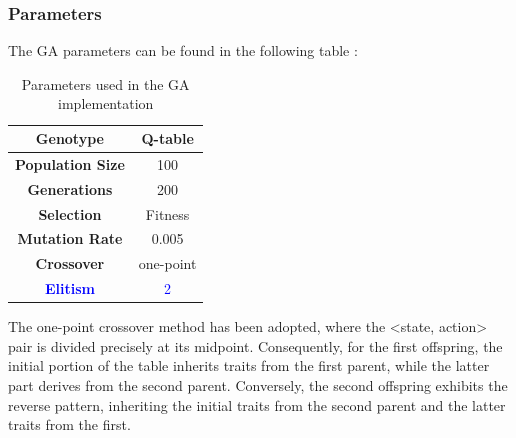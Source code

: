 \subsubsection{Parameters}
The GA parameters can be found in the following table :
\begin{table}[htb]%
	\centering
	\caption{Parameters used in the GA implementation}
	\label{tab:GA_parameters}
	\begin{tabular}{|S|S|} 		%
		
		\hline
		{\textbf{Genotype}} &  {Q-table} \\
		\hline
		{\textbf{Population Size}} & {100} \\
		\hline
		{\textbf{Generations}} & {200} \\
		\hline
		{\textbf{Selection}}  & {Fitness} \\
		\hline
		{\textbf{Mutation Rate}} & {0.005} \\
		\hline
		{\textbf{Crossover}}& {one-point} \\
		\hline
		{\textbf{\textcolor{blue}{Elitism}}}& {\textcolor{blue}{2} } \\
		\hline

	\end{tabular}
\end{table}

The one-point crossover method has been adopted, where the <state, action> pair is divided precisely at its midpoint. Consequently, for the first offspring, the initial portion of the table inherits traits from the first parent, while the latter part derives from the second parent. Conversely, the second offspring exhibits the reverse pattern, inheriting the initial traits from the second parent and the latter traits from the first.

